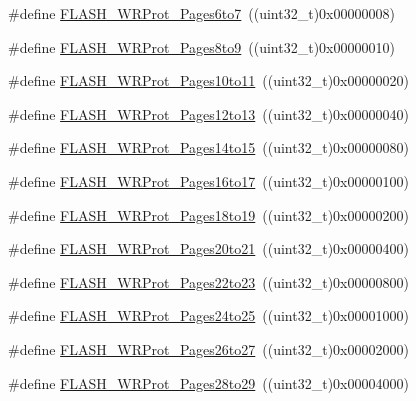 \begin{DoxyCompactItemize}
\item 
\#define \hyperlink{group___option___bytes___write___protection_ga289b919ff7f6e7287facf108b8b94619}{F\+L\+A\+S\+H\+\_\+\+W\+R\+Prot\+\_\+\+Pages6to7}~((uint32\+\_\+t)0x00000008)
\item 
\#define \hyperlink{group___option___bytes___write___protection_ga72f231c0fe953f3cd43cf421c2626f90}{F\+L\+A\+S\+H\+\_\+\+W\+R\+Prot\+\_\+\+Pages8to9}~((uint32\+\_\+t)0x00000010)
\item 
\#define \hyperlink{group___option___bytes___write___protection_ga778d8038df46c0d25d9a24717a5c5dc9}{F\+L\+A\+S\+H\+\_\+\+W\+R\+Prot\+\_\+\+Pages10to11}~((uint32\+\_\+t)0x00000020)
\item 
\#define \hyperlink{group___option___bytes___write___protection_ga571e248a64ef9bf7f99ed85831aacaaa}{F\+L\+A\+S\+H\+\_\+\+W\+R\+Prot\+\_\+\+Pages12to13}~((uint32\+\_\+t)0x00000040)
\item 
\#define \hyperlink{group___option___bytes___write___protection_ga5e5fcead35c861e1329c3e4e7e3ffa4e}{F\+L\+A\+S\+H\+\_\+\+W\+R\+Prot\+\_\+\+Pages14to15}~((uint32\+\_\+t)0x00000080)
\item 
\#define \hyperlink{group___option___bytes___write___protection_ga33deabc2c4a82cfa4a98008082e29ea7}{F\+L\+A\+S\+H\+\_\+\+W\+R\+Prot\+\_\+\+Pages16to17}~((uint32\+\_\+t)0x00000100)
\item 
\#define \hyperlink{group___option___bytes___write___protection_ga856fdcf3d41edc73902fcf93a1e375d9}{F\+L\+A\+S\+H\+\_\+\+W\+R\+Prot\+\_\+\+Pages18to19}~((uint32\+\_\+t)0x00000200)
\item 
\#define \hyperlink{group___option___bytes___write___protection_ga09215d5d245c8f5cd664c5cc4ff9fb69}{F\+L\+A\+S\+H\+\_\+\+W\+R\+Prot\+\_\+\+Pages20to21}~((uint32\+\_\+t)0x00000400)
\item 
\#define \hyperlink{group___option___bytes___write___protection_ga58394c78e6b08542381ade1674efe62c}{F\+L\+A\+S\+H\+\_\+\+W\+R\+Prot\+\_\+\+Pages22to23}~((uint32\+\_\+t)0x00000800)
\item 
\#define \hyperlink{group___option___bytes___write___protection_gac36c4a402c77b28f46451e97dc3632f7}{F\+L\+A\+S\+H\+\_\+\+W\+R\+Prot\+\_\+\+Pages24to25}~((uint32\+\_\+t)0x00001000)
\item 
\#define \hyperlink{group___option___bytes___write___protection_ga92c8a9f8b6875fccb072df795eff5e7e}{F\+L\+A\+S\+H\+\_\+\+W\+R\+Prot\+\_\+\+Pages26to27}~((uint32\+\_\+t)0x00002000)
\item 
\#define \hyperlink{group___option___bytes___write___protection_gae42c20bedcbaf926c7c49f51a7eea63f}{F\+L\+A\+S\+H\+\_\+\+W\+R\+Prot\+\_\+\+Pages28to29}~((uint32\+\_\+t)0x00004000)

\end{DoxyCompactItemize}
